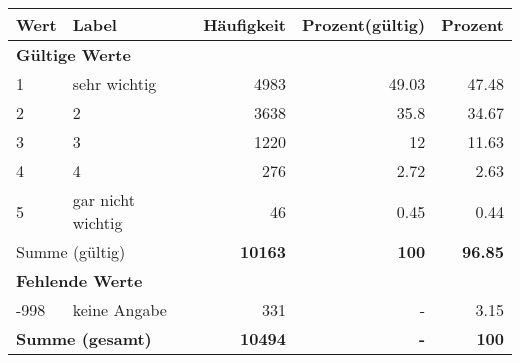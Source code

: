      \begin{longtable}{lXrrr}
     \toprule
     \textbf{Wert} & \textbf{Label} & \textbf{Häufigkeit} & \textbf{Prozent(gültig)} & \textbf{Prozent} \\
     \endhead
     \midrule
     \multicolumn{5}{l}{\textbf{Gültige Werte}}\\

     1 &
     \multicolumn{1}{X}{ sehr wichtig   } &


       \num{4983} &
       \num[round-mode=places,round-precision=2]{49.03} &
         \num[round-mode=places,round-precision=2]{47.48} \\

     2 &
     \multicolumn{1}{X}{ 2   } &


       \num{3638} &
       \num[round-mode=places,round-precision=2]{35.8} &
         \num[round-mode=places,round-precision=2]{34.67} \\

     3 &
     \multicolumn{1}{X}{ 3   } &


       \num{1220} &
       \num[round-mode=places,round-precision=2]{12} &
         \num[round-mode=places,round-precision=2]{11.63} \\

     4 &
     \multicolumn{1}{X}{ 4   } &


       \num{276} &
       \num[round-mode=places,round-precision=2]{2.72} &
         \num[round-mode=places,round-precision=2]{2.63} \\

     5 &
     \multicolumn{1}{X}{ gar nicht wichtig   } &


       \num{46} &
       \num[round-mode=places,round-precision=2]{0.45} &
         \num[round-mode=places,round-precision=2]{0.44} \\
     \midrule
     \multicolumn{2}{l}{Summe (gültig)} &
       \textbf{\num{10163}} &
     \textbf{\num{100}} &
       \textbf{\num[round-mode=places,round-precision=2]{96.85}} \\
     \multicolumn{5}{l}{\textbf{Fehlende Werte}}\\
       -998 &
       keine Angabe &
         \num{331} &
        - &
         \num[round-mode=places,round-precision=2]{3.15} \\
     \midrule
     \multicolumn{2}{l}{\textbf{Summe (gesamt)}} &
          \textbf{\num{10494}} &
        \textbf{-} &
        \textbf{\num{100}} \\
     \bottomrule
     \end{longtable}
     
